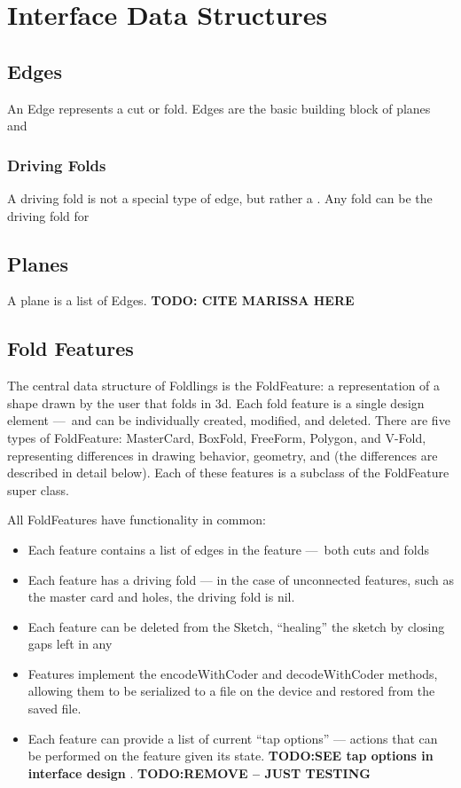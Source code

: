 \section{Interface Data Structures}\label{interface-data-structures}

\subsection{Edges}\label{edges}

An Edge represents a cut or fold. Edges are the basic building block of
planes and

\subsubsection{Driving Folds}\label{driving-folds}

A driving fold is not a special type of edge, but rather a . Any fold
can be the driving fold for

\subsection{Planes}\label{planes}

A plane is a list of Edges. \textbf{TODO: CITE MARISSA HERE}

\subsection{Fold Features}\label{fold-features}

The central data structure of Foldlings is the FoldFeature: a
representation of a shape drawn by the user that folds in 3d. Each fold
feature is a single design element ---~and can be individually created,
modified, and deleted. There are five types of FoldFeature: MasterCard,
BoxFold, FreeForm, Polygon, and V-Fold, representing differences in
drawing behavior, geometry, and (the differences are described in detail
below). Each of these features is a subclass of the FoldFeature super
class.

All FoldFeatures have functionality in common:

\begin{itemize}
\itemsep1pt\parskip0pt
\item
  Each feature contains a list of edges in the feature ---~both cuts and
  folds
\item
  Each feature has a driving fold --- in the case of unconnected
  features, such as the master card and holes, the driving fold is nil.
\item
  Each feature can be deleted from the Sketch, ``healing'' the sketch by
  closing gaps left in any
\item
  Features implement the encodeWithCoder and decodeWithCoder methods,
  allowing them to be serialized to a file on the device and restored
  from the saved file.
\item
  Each feature can provide a list of current ``tap options'' --- actions
  that can be performed on the feature given its state. \textbf{TODO:SEE
  tap options in interface design} \citep{Nobody06}. \textbf{TODO:REMOVE
  -- JUST TESTING}
\end{itemize}

